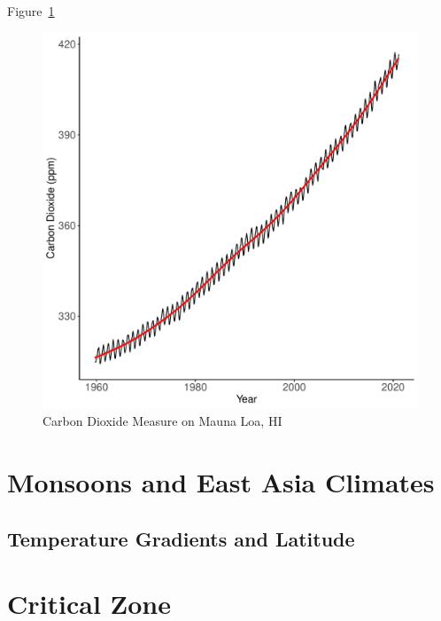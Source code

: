 \documentclass{book}\usepackage{knitr}
\begin{document}
Figure~\ref{fig:maunaloa2}

\begin{figure}
\begin{knitrout}
\color{fgcolor}
\includegraphics[width=\maxwidth]{figure/maunaloa3-1} 

\end{knitrout}
\caption{Carbon Dioxide Measure on Mauna Loa, HI}
\label{fig:maunaloa2}
\end{figure}






\chapter{Monsoons and East Asia Climates}

\section{Temperature Gradients and Latitude}





\chapter{Critical Zone}\label{ch:critical-zone}
\end{document}
